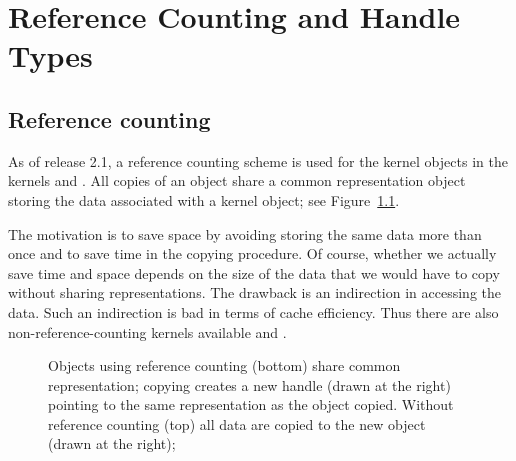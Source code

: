 
\chapter{Reference Counting and Handle Types}
\label{chap:reference_counting}


\section{Reference counting}
As of release 2.1, a reference counting%
 scheme is used for
the kernel objects in the kernels  and 
. 
All copies of an object share a common representation object storing
the data associated with a kernel object; see Figure~\ref{fig:refcounted}.

The motivation is to save space by avoiding storing the same data more 
than once and to save time in the copying procedure. 
Of course, whether we actually save time and space depends on the size 
of the data that we would have to copy without sharing representations.
The drawback is an indirection in accessing the data. Such an indirection is 
bad in terms of cache efficiency. 
Thus there are also non-reference-counting kernels available
 and .

\begin{figure}
\caption{Objects using reference counting (bottom) share common representation;
copying creates a new handle (drawn at the right) pointing to the same 
representation as the object copied. Without reference counting (top) 
all data are copied to the new object (drawn at the right);\label{fig:refcounted}} 
\end{figure}


